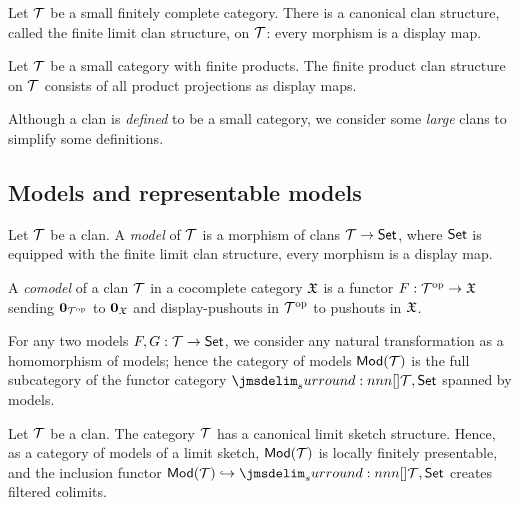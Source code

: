 \documentclass[a4paper]{article}
\begin{document}
\begin{example}
  Let $\mathcal{T}$ be a small finitely complete category.
  There is a canonical clan structure, called the finite limit clan structure, on $\mathcal{T}$: every morphism is a display map.
\end{example}

\begin{example}
  Let $\mathcal{T}$ be a small category with finite products.
  The finite product clan structure on $\mathcal{T}$ consists of all product projections as display maps.
\end{example}

\begin{remark}
  Although a clan is \emph{defined} to be a small category, we consider some \emph{large} clans to simplify some definitions.
\end{remark}

\subsection{Models and representable models}
\begin{definition}
  Let $\mathcal{T}$ be a clan.
  A \emph{model} of $\mathcal{T}$ is a morphism of clans $\mathcal{T} \to \mathsf{Set}$, where $\mathsf{Set}$ is equipped with the finite limit clan structure, \ie every morphism is a display map.
\end{definition}

\begin{definition}
  A \emph{comodel} of a clan $\mathcal{T}$ in a cocomplete category $\mathfrak{X}$ is a functor $F : \mathcal{T}^{\mathrm{op}} \to \mathfrak{X}$ sending $\mathbf{0}_{\mathcal{T}^{\mathrm{op}}}$ to $\mathbf{0}_{\mathfrak{X}}$ and display-pushouts in $\mathcal{T}^{\mathrm{op}}$ to pushouts in $\mathfrak{X}$.
\end{definition}

\begin{remark}
  For any two models $F, G : \mathcal{T} \to \mathsf{Set}$, we consider any natural transformation as a homomorphism of models; hence the category of models $\mathsf{Mod}(\mathcal{T})$ is the full subcategory of the functor category $\funCat{\cT}{\Set}$ spanned by models.
\end{remark}

\begin{remark}
  Let $\mathcal{T}$ be a clan.
  The category $\mathcal{T}$ has a canonical limit sketch structure.
  Hence, as a category of models of a limit sketch, $\mathsf{Mod}(\mathcal{T})$ is locally finitely presentable, and the inclusion functor $\Mod(\cT) \into \funCat{\cT}{\Set}$ creates filtered colimits.
\end{remark}
\end{document}

